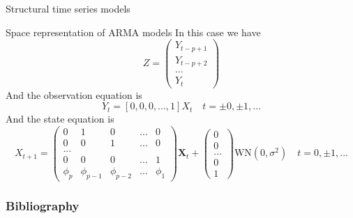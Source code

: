 \documentclass[11pt]{beamer}
\begin{document}
\begin{frame}{Structural time series models \cite{pml2Book}}
\small
\begin{exampleblock}{Space representation of ARMA models}
In this case we have 
\begin{equation}
Z= \begin{pmatrix} Y_{t-p+1} \\ Y_{t-p+2}  \\ ... \\ Y_{t} \end{pmatrix}
\end{equation}
And the observation equation is
\begin{equation}
Y_{t}=[0,0,0,...,1]X_{t} \quad t=\pm 0,\pm 1,...
\end{equation}
And the state equation is 
\begin{equation}
X_{t+1}= \begin{pmatrix} 0 & 1 &  0 &... & 0 \\ 0 & 0 & 1 & ... & 0  \\ ... \\ 0 & 0  & 0 & ... & 1 \\ \phi_{p} & \phi_{p-1} & \phi_{p-2} & ... & \phi_{1} \end{pmatrix} \bm{X}_{t}+ \begin{pmatrix} 0 \\ 0 \\... \\ 0 \\ 1 \end{pmatrix}\textrm{WN}(0,\sigma^{2}) \quad t=0,\pm{1},...
\end{equation}
\end{exampleblock}
\end{frame}




\begin{frame}
\frametitle{Bibliography}
\printbibliography
\end{frame}
\end{document}
